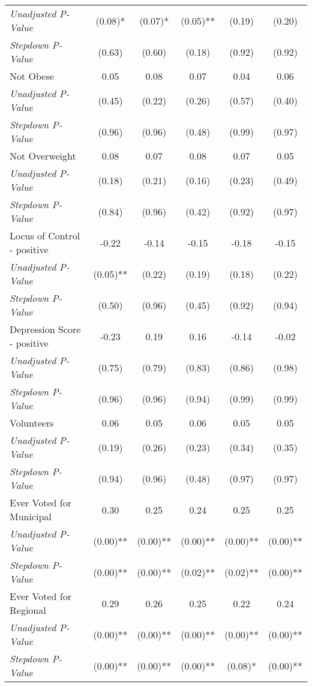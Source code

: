 \begin{tabular}{l c c c c c}
\quad \textit{Unadjusted P-Value} & (0.08)* & (0.07)* & (0.05)** & (0.19) & (0.20) \\
\quad \textit{Stepdown P-Value} & (0.63) & (0.60) & (0.18) & (0.92) & (0.92) \\
Not Obese & 0.05 & 0.08 & 0.07 & 0.04 & 0.06 \\
\quad \textit{Unadjusted P-Value} & (0.45) & (0.22) & (0.26) & (0.57) & (0.40) \\
\quad \textit{Stepdown P-Value} & (0.96) & (0.96) & (0.48) & (0.99) & (0.97) \\
Not Overweight & 0.08 & 0.07 & 0.08 & 0.07 & 0.05 \\
\quad \textit{Unadjusted P-Value} & (0.18) & (0.21) & (0.16) & (0.23) & (0.49) \\
\quad \textit{Stepdown P-Value} & (0.84) & (0.96) & (0.42) & (0.92) & (0.97) \\
Locus of Control - positive & -0.22 & -0.14 & -0.15 & -0.18 & -0.15 \\
\quad \textit{Unadjusted P-Value} & (0.05)** & (0.22) & (0.19) & (0.18) & (0.22) \\
\quad \textit{Stepdown P-Value} & (0.50) & (0.96) & (0.45) & (0.92) & (0.94) \\
Depression Score - positive & -0.23 & 0.19 & 0.16 & -0.14 & -0.02 \\
\quad \textit{Unadjusted P-Value} & (0.75) & (0.79) & (0.83) & (0.86) & (0.98) \\
\quad \textit{Stepdown P-Value} & (0.96) & (0.96) & (0.94) & (0.99) & (0.99) \\
Volunteers & 0.06 & 0.05 & 0.06 & 0.05 & 0.05 \\
\quad \textit{Unadjusted P-Value} & (0.19) & (0.26) & (0.23) & (0.34) & (0.35) \\
\quad \textit{Stepdown P-Value} & (0.94) & (0.96) & (0.48) & (0.97) & (0.97) \\
Ever Voted for Municipal & 0.30 & 0.25 & 0.24 & 0.25 & 0.25 \\
\quad \textit{Unadjusted P-Value} & (0.00)** & (0.00)** & (0.00)** & (0.00)** & (0.00)** \\
\quad \textit{Stepdown P-Value} & (0.00)** & (0.00)** & (0.02)** & (0.02)** & (0.00)** \\
Ever Voted for Regional & 0.29 & 0.26 & 0.25 & 0.22 & 0.24 \\
\quad \textit{Unadjusted P-Value} & (0.00)** & (0.00)** & (0.00)** & (0.00)** & (0.00)** \\
\quad \textit{Stepdown P-Value} & (0.00)** & (0.00)** & (0.00)** & (0.08)* & (0.00)** \\

\end{tabular}
